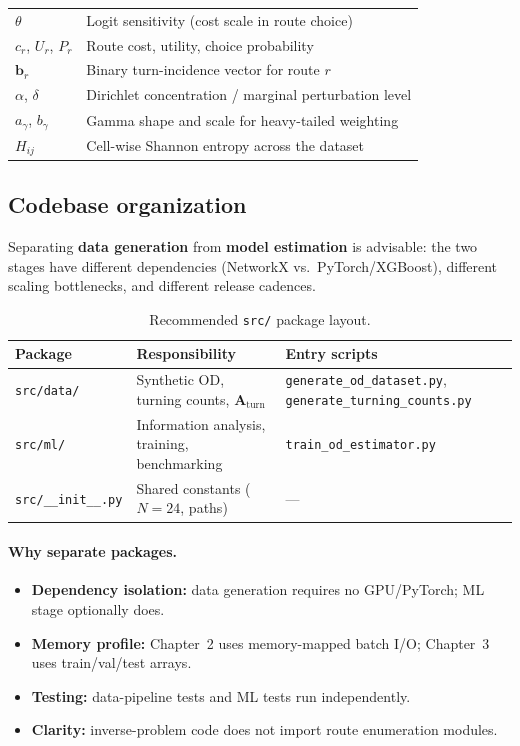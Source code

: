 \documentclass[11pt,a4paper]{report}
\newcommand{\Aturn}{\mathbf{A}_{\mathrm{turn}}}
\begin{document}
\begin{table}[ht]
\begin{tabular}{@{}ll@{}}
$\theta$ & Logit sensitivity (cost scale in route choice) \\
$c_r$, $U_r$, $P_r$ & Route cost, utility, choice probability \\
$\mathbf{b}_r$ & Binary turn-incidence vector for route $r$ \\
$\alpha$, $\delta$ & Dirichlet concentration / marginal perturbation level \\
$a_{\gamma}$, $b_{\gamma}$ & Gamma shape and scale for heavy-tailed weighting \\
$H_{ij}$ & Cell-wise Shannon entropy across the dataset \\
\bottomrule
\end{tabular}
\end{table}

\subsection{Codebase organization}

Separating \textbf{data generation} from \textbf{model estimation} is advisable: the two stages have different dependencies (NetworkX vs.\ PyTorch/XGBoost), different scaling bottlenecks, and different release cadences.

\begin{table}[ht]
\centering
\caption{Recommended \texttt{src/} package layout.}
\label{tab:code_layout}
\small
\begin{tabular}{@{}p{3.2cm}p{5.2cm}p{4.8cm}@{}}
\toprule
\textbf{Package} & \textbf{Responsibility} & \textbf{Entry scripts} \\
\midrule
\texttt{src/data/} &
Synthetic OD, turning counts, $\Aturn$ &
\texttt{generate\_od\_dataset.py}, \texttt{generate\_turning\_counts.py} \\
\texttt{src/ml/} &
Information analysis, training, benchmarking &
\texttt{train\_od\_estimator.py} \\
\texttt{src/\_\_init\_\_.py} &
Shared constants ($N=24$, paths) &
--- \\
\bottomrule
\end{tabular}
\end{table}

\paragraph{Why separate packages.}
\begin{itemize}[noitemsep]
    \item \textbf{Dependency isolation:} data generation requires no GPU/PyTorch; ML stage optionally does.
    \item \textbf{Memory profile:} Chapter~2 uses memory-mapped batch I/O; Chapter~3 uses train/val/test arrays.
    \item \textbf{Testing:} data-pipeline tests and ML tests run independently.
    \item \textbf{Clarity:} inverse-problem code does not import route enumeration modules.
\end{itemize}
\end{document}

